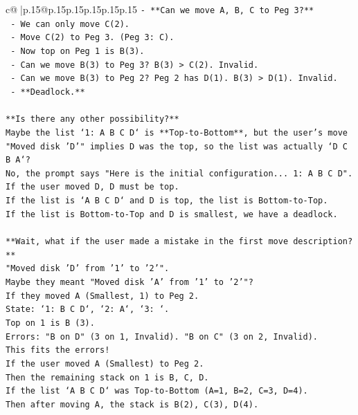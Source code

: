 \documentclass{article}
\begin{document}
{\begin{supertabular}{c@{$\;$}|p{.15\linewidth}@{}p{.15\linewidth}p{.15\linewidth}p{.15\linewidth}p{.15\linewidth}p{.15\linewidth}}
{{{\texttt{{-} **Can we move A, B, C to Peg 3?**} \\
\texttt{  {-} We can only move C(2).} \\
\texttt{  {-} Move C(2) to Peg 3. (Peg 3: C).} \\
\texttt{  {-} Now top on Peg 1 is B(3).} \\
\texttt{  {-} Can we move B(3) to Peg 3? B(3) > C(2). Invalid.} \\
\texttt{  {-} Can we move B(3) to Peg 2? Peg 2 has D(1). B(3) > D(1). Invalid.} \\
\texttt{  {-} **Deadlock.**} \\
\\ 
\texttt{**Is there any other possibility?**} \\
\texttt{Maybe the list `1: A B C D` is **Top{-}to{-}Bottom**, but the user's move "Moved disk 'D'" implies D was the top, so the list was actually `D C B A`?} \\
\texttt{No, the prompt says "Here is the initial configuration... 1: A B C D".} \\
\texttt{If the user moved D, D must be top.} \\
\texttt{If the list is `A B C D` and D is top, the list is Bottom{-}to{-}Top.} \\
\texttt{If the list is Bottom{-}to{-}Top and D is smallest, we have a deadlock.} \\
\\ 
\texttt{**Wait, what if the user made a mistake in the first move description?**} \\
\texttt{"Moved disk 'D' from '1' to '2'".} \\
\texttt{Maybe they meant "Moved disk 'A' from '1' to '2'"?} \\
\texttt{If they moved A (Smallest, 1) to Peg 2.} \\
\texttt{State: `1: B C D`, `2: A`, `3: `.} \\
\texttt{Top on 1 is B (3).} \\
\texttt{Errors: "B on D" (3 on 1, Invalid). "B on C" (3 on 2, Invalid).} \\
\texttt{This fits the errors!} \\
\texttt{If the user moved A (Smallest) to Peg 2.} \\
\texttt{Then the remaining stack on 1 is B, C, D.} \\
\texttt{If the list `A B C D` was Top{-}to{-}Bottom (A=1, B=2, C=3, D=4).} \\
\texttt{Then after moving A, the stack is B(2), C(3), D(4).} \\
}}}
\end{supertabular}}
\end{document}
